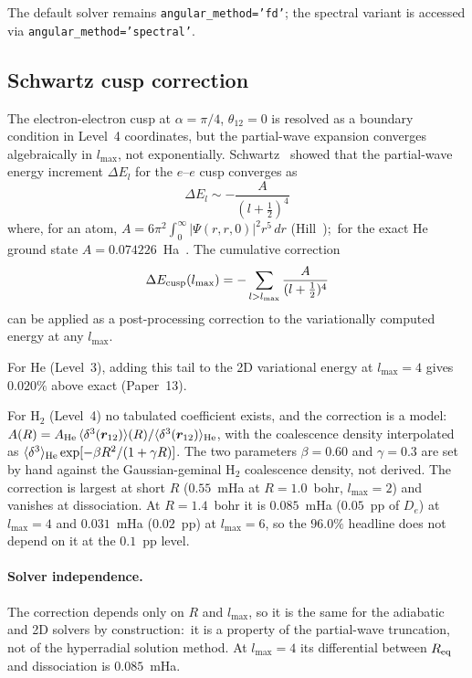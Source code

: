 \documentclass[aps,pra,twocolumn,superscriptaddress,longbibliography]{revtex4-2}
\begin{document}
The default solver remains \texttt{angular\_method='fd'};
the spectral variant is accessed via
\texttt{angular\_method='spectral'}.

\subsection{Schwartz cusp correction}
\label{sec:cusp_correction}

The electron-electron cusp at $\alpha = \pi/4$, $\theta_{12} = 0$
is resolved as a boundary condition in Level~4 coordinates, but the
partial-wave expansion converges algebraically in $l_{\max}$, not
exponentially.  Schwartz~\cite{schwartz1962} showed that the
partial-wave energy increment $\Delta E_l$ for the $e$--$e$ cusp
converges as
\begin{equation}
  \Delta E_l \sim -\frac{A}{(l + \tfrac{1}{2})^4}
  \label{eq:schwartz}
\end{equation}
where, for an atom, $A = 6\pi^2\int_0^\infty |\Psi(r,r,0)|^2 r^5\,dr$
(Hill~\cite{hill1985});\ for the exact He ground state
$A = 0.074226$~Ha~\cite{bromley_mitroy2006}.  The cumulative correction
\begin{equation}
  \Delta E_{\rm cusp}(l_{\max})
    = -\sum_{l > l_{\max}} \frac{A}{(l + \tfrac{1}{2})^4}
  \label{eq:cusp_sum}
\end{equation}
can be applied as a post-processing correction to the variationally
computed energy at any $l_{\max}$.

For He (Level~3), adding this tail to the 2D variational energy at
$l_{\max} = 4$ gives $0.020\%$ above exact (Paper~13).

For H$_2$ (Level~4) no tabulated coefficient exists, and the
correction is a model:\ $A(R) = A_{\rm He}\,
\langle\delta^3(\bm r_{12})\rangle(R)/\langle\delta^3(\bm r_{12})\rangle_{\rm He}$,
with the coalescence density interpolated as
$\langle\delta^3\rangle_{\rm He}\exp[-\beta R^2/(1+\gamma R)]$.
The two parameters $\beta = 0.60$ and $\gamma = 0.3$ are set by hand
against the Gaussian-geminal H$_2$ coalescence density, not derived.
The correction is largest at short $R$ ($0.55$~mHa at $R = 1.0$~bohr,
$l_{\max}=2$) and vanishes at dissociation.  At $R = 1.4$~bohr it is
$0.085$~mHa ($0.05$~pp of $D_e$) at $l_{\max}=4$ and $0.031$~mHa
($0.02$~pp) at $l_{\max}=6$, so the $96.0\%$ headline does not
depend on it at the $0.1$~pp level.

\paragraph{Solver independence.}
The correction depends only on $R$ and $l_{\max}$, so it is the same
for the adiabatic and 2D solvers by construction:\ it is a property of
the partial-wave truncation, not of the hyperradial solution method.
At $l_{\max} = 4$ its differential between $R_{\rm eq}$ and
dissociation is $0.085$~mHa.
\end{document}

